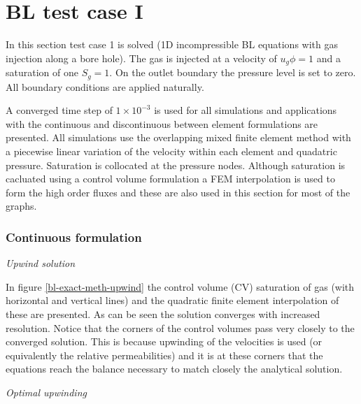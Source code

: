 



\section{BL test case I}

In this section test case 1 is solved (1D incompressible
BL equations with gas injection along a bore hole).
The gas is injected at a velocity of $u_g \phi =1$ and
a saturation of one $S_g=1$. On the outlet boundary the
pressure level is set to zero. All boundary conditions are
applied naturally.

A converged time step of $1\times 10^{-3}$ is used for all simulations
and applications with the continuous and discontinuous between
element formulations are presented. All simulations
use the overlapping mixed finite element method with a
piecewise linear variation of the velocity within each
element and quadatric pressure. Saturation is collocated at
the pressure nodes. Although saturation is cacluated using
a control volume formulation a FEM interpolation is
used to form the high order fluxes and these are also
used in this section for most of the graphs.


\subsubsection{Continuous formulation}

{\it Upwind solution}

In figure \ref{bl-exact-meth-upwind}  the
control volume (CV) saturation of gas (with horizontal and vertical lines) and
the quadratic finite element interpolation of these are
presented.
As can be seen the solution converges with increased resolution.
Notice that the corners of the control volumes pass
very closely
to the converged solution. This is because upwinding of
the velocities is used (or equivalently the relative permeabilities)
and it is at these corners that the equations reach the
balance necessary to match closely the analytical solution.

{\it Optimal upwinding}

